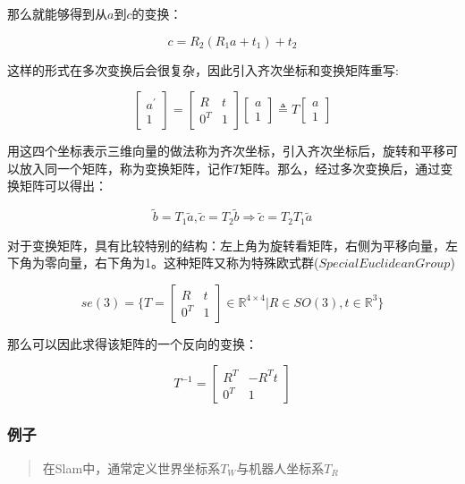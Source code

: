     那么就能够得到从$a$到$c$的变换：

$$
    c = R_2(R_1a + t_1) + t_2
$$

    这样的形式在多次变换后会很复杂，因此引入齐次坐标和变换矩阵重写:

$$
\begin{bmatrix}
    a^{'} \\ 1
\end{bmatrix} = 
\begin{bmatrix}
    R & t \\ 
    0^T & 1
\end{bmatrix}
\begin{bmatrix}
    a \\ 1
\end{bmatrix} \triangleq T 
\begin{bmatrix}
    a \\ 1
\end{bmatrix}
$$

    用这四个坐标表示三维向量的做法称为齐次坐标，引入齐次坐标后，旋转和平移可以放入同一个矩阵，称为变换矩阵，记作$T$矩阵。那么，经过多次变换后，通过变换矩阵可以得出：

$$
    \tilde{b} = T_1\tilde{a}, \tilde{c} = T_2\tilde{b} \Rightarrow \tilde{c} = T_2T_1\tilde{a}
$$

    对于变换矩阵，具有比较特别的结构：左上角为旋转看矩阵，右侧为平移向量，左下角为零向量，右下角为1。这种矩阵又称为特殊欧式群($Special Euclidean Group$)

$$
se(3) = \{ T = 
\begin{bmatrix}
    R & t \\
    0^T & 1
\end{bmatrix} \in \mathbb{R}^{4 \times 4} | R \in SO(3), t \in \mathbb{R}^3
\}
$$

    那么可以因此求得该矩阵的一个反向的变换：

$$
T^{-1} = 
\begin{bmatrix}
    R^T & -R^Tt \\
    0^T & 1
\end{bmatrix}
$$

\subsubsection{例子}

\begin{quote}
    \centering
    在Slam中，通常定义世界坐标系$T_W$与机器人坐标系$T_R$
\end{quote}

